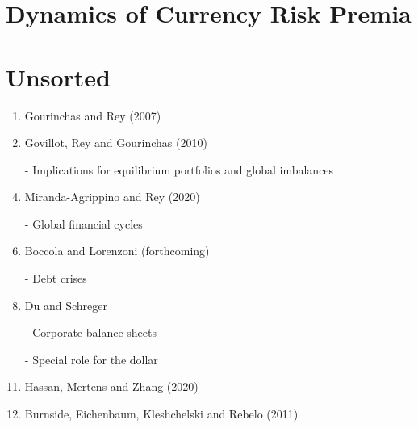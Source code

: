 \documentclass[12pt,letter]{article}
\theoremstyle{break} \theorembodyfont{\normalfont\itshape}
\theoremstyle{break}
\theoremstyle{break} \theorembodyfont{\normalfont\itshape}
\theoremstyle{break} \theorembodyfont{\normalfont\itshape}
\begin{document}
\section{Dynamics of Currency Risk Premia}


\section{Unsorted}
\begin{enumerate}
\item Gourinchas and Rey (2007)
\item Govillot, Rey and Gourinchas (2010)
\item[-] Implications for equilibrium portfolios and global imbalances
\item Miranda-Agrippino and Rey (2020)
\item[-] Global financial cycles
\item Boccola and Lorenzoni (forthcoming)
\item[-] Debt crises
\item Du and Schreger
\item[-] Corporate balance sheets
\item[-] Special role for the dollar
\item Hassan, Mertens and Zhang (2020)
\item Burnside, Eichenbaum, Kleshchelski and Rebelo (2011)
\end{enumerate}
\end{document}
